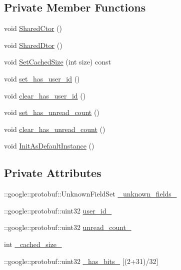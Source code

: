 \subsection*{Private Member Functions}
\begin{DoxyCompactItemize}
\item 
void \hyperlink{class_i_m_1_1_base_define_1_1_server_un_read_info_aa6cfb26a8459073c67251ee764be3a4b}{Shared\+Ctor} ()
\item 
void \hyperlink{class_i_m_1_1_base_define_1_1_server_un_read_info_ac183852577d6a8c12eea16da664a10e9}{Shared\+Dtor} ()
\item 
void \hyperlink{class_i_m_1_1_base_define_1_1_server_un_read_info_abf19c0e5a45b6e15c89890b538ae2caf}{Set\+Cached\+Size} (int size) const 
\item 
void \hyperlink{class_i_m_1_1_base_define_1_1_server_un_read_info_af9e3dbbcdda18c7fee32a5399c183e62}{set\+\_\+has\+\_\+user\+\_\+id} ()
\item 
void \hyperlink{class_i_m_1_1_base_define_1_1_server_un_read_info_a1195c4b7220ce3d991bc678133920b78}{clear\+\_\+has\+\_\+user\+\_\+id} ()
\item 
void \hyperlink{class_i_m_1_1_base_define_1_1_server_un_read_info_abeaaac1820bda8c82b567243314482ab}{set\+\_\+has\+\_\+unread\+\_\+count} ()
\item 
void \hyperlink{class_i_m_1_1_base_define_1_1_server_un_read_info_aedbc6a6f6acb4c2fce39e574acb7ee51}{clear\+\_\+has\+\_\+unread\+\_\+count} ()
\item 
void \hyperlink{class_i_m_1_1_base_define_1_1_server_un_read_info_a37a7a8dcc30653ebfee7cb4fe151c27c}{Init\+As\+Default\+Instance} ()
\end{DoxyCompactItemize}
\subsection*{Private Attributes}
\begin{DoxyCompactItemize}
\item 
\+::google\+::protobuf\+::\+Unknown\+Field\+Set \hyperlink{class_i_m_1_1_base_define_1_1_server_un_read_info_a8964ec83a094f836e0925b8dcc9f09b1}{\+\_\+unknown\+\_\+fields\+\_\+}
\item 
\+::google\+::protobuf\+::uint32 \hyperlink{class_i_m_1_1_base_define_1_1_server_un_read_info_a578032e1ab85968c80918e4aa1ae50dd}{user\+\_\+id\+\_\+}
\item 
\+::google\+::protobuf\+::uint32 \hyperlink{class_i_m_1_1_base_define_1_1_server_un_read_info_a7540121ccfaddc5aaff134c8c472cc45}{unread\+\_\+count\+\_\+}
\item 
int \hyperlink{class_i_m_1_1_base_define_1_1_server_un_read_info_a9803b6ca033a84da4e3561d0dbc0e241}{\+\_\+cached\+\_\+size\+\_\+}
\item 
\+::google\+::protobuf\+::uint32 \hyperlink{class_i_m_1_1_base_define_1_1_server_un_read_info_af33565f16082da45b45e05cc51d7aae0}{\+\_\+has\+\_\+bits\+\_\+} \mbox{[}(2+31)/32\mbox{]}
\end{DoxyCompactItemize}
